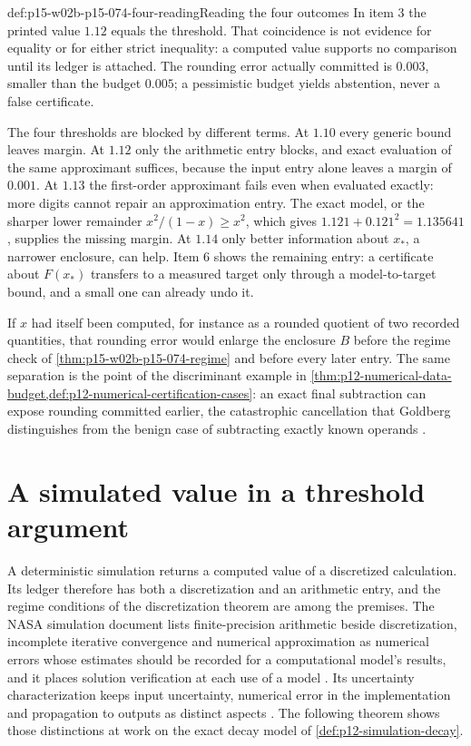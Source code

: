 \begin{hbexample}{def:p15-w02b-p15-074-four-reading}{Reading the four outcomes}
In item 3 the printed value \(1.12\) equals the threshold. That
coincidence is not evidence for equality or for either strict inequality:
a computed value supports no comparison until its ledger is attached. The rounding error actually committed is \(0.003\),
smaller than the budget \(0.005\); a pessimistic budget yields abstention,
never a false certificate.

The four thresholds are blocked by different terms. At \(1.10\) every
generic bound leaves margin. At \(1.12\) only the arithmetic entry blocks,
and exact evaluation of the same approximant suffices, because the input
entry alone leaves a margin of \(0.001\). At \(1.13\) the first-order
approximant fails even when evaluated exactly: more digits cannot repair
an approximation entry. The exact model, or the sharper lower remainder
\(x^2/(1-x)\geq x^2\), which gives \(1.121+0.121^2=1.135641\), supplies
the missing margin. At \(1.14\) only better information about \(x_*\), a
narrower enclosure, can help. Item 6 shows the remaining entry: a
certificate about \(F(x_*)\) transfers to a measured target only through a
model-to-target bound, and a small one can already undo it.

If \(\widehat x\) had itself been computed, for instance as a rounded
quotient of two recorded quantities, that rounding error would enlarge the
enclosure \(B\) before the regime check of
\cref{thm:p15-w02b-p15-074-regime} and before every later entry.
The same separation is the point of the discriminant example in
\cref{thm:p12-numerical-data-budget,def:p12-numerical-certification-cases}:
an exact final subtraction can expose rounding committed earlier, the
catastrophic cancellation that Goldberg distinguishes from the benign case
of subtracting exactly known operands
\cite[Section D.3.4]{GoldbergOracle8193693}.
\end{hbexample}

\section{A simulated value in a threshold argument}
\label{sec:p15-w02b-p15-074-simulation}

A deterministic simulation returns a computed value of a discretized
calculation. Its ledger therefore has both a discretization and an
arithmetic entry, and the regime conditions of the discretization theorem
are among the premises. The NASA simulation document lists finite-precision
arithmetic beside discretization, incomplete iterative convergence and
numerical approximation as numerical errors whose estimates should be
recorded for a computational model's results, and it places solution
verification at each use of a model
\cite[Sections 4.2.3--4.2.4]{NASA7009B2024}. Its uncertainty
characterization keeps input uncertainty, numerical error in the
implementation and propagation to outputs as distinct aspects
\cite[Section E.4.4]{NASA7009B2024}. The following theorem shows those
distinctions at work on the exact decay model of
\cref{def:p12-simulation-decay}.

